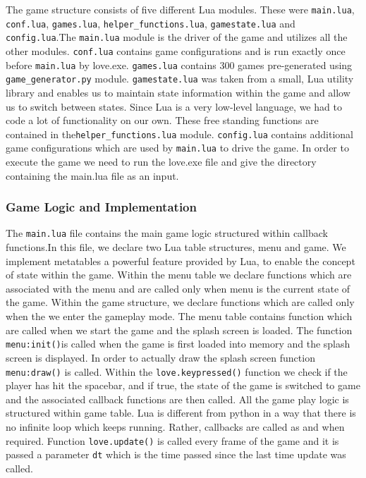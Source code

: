 	The game structure consists of five different Lua modules. These were \texttt{main.lua}, \texttt{conf.lua}, \texttt{games.lua},  \texttt{helper\_functions.lua}, \texttt{gamestate.lua} and \texttt{config.lua}.The \texttt{main.lua} module is the driver of the game and utilizes all the other modules. \texttt{conf.lua} contains game configurations and is run exactly once before \texttt{main.lua} by love.exe. \texttt{games.lua} contains 300 games pre-generated using \texttt{game\_generator.py} module. \texttt{gamestate.lua} was taken from  a small, Lua utility library and enables us to maintain state information within the game and allow us to switch between states. Since Lua is a very low-level language, we had to code a lot of functionality on our own. These free standing functions are contained in the\texttt{helper\_functions.lua} module. \texttt{config.lua} contains additional game configurations which are used by \texttt{main.lua} to drive the game. In order to execute the game we need to run the love.exe file and give the directory containing the main.lua file as an input.
	\subsubsection{Game Logic and Implementation}
	
	The \texttt{main.lua} file contains the main game logic structured within callback functions.In this file, we declare two Lua table structures, menu and game. We implement metatables a powerful feature provided by Lua, to enable the concept of state within the game. Within the menu table we declare functions which are associated with the menu and are called only when menu is the current state of the game. Within the game structure, we declare functions which are called only when the we enter the gameplay mode.
	The menu table contains function which are called when we start the game and the splash screen is loaded. The function \texttt{menu:init()}is called when the game is first loaded into memory and the splash screen is displayed. In order to actually draw the splash screen function \texttt{menu:draw()} is called. Within the \texttt{love.keypressed()} function we check if the player has hit the spacebar, and if true, the state of the game is switched to game and the associated callback functions are then called. All the game play logic is structured within game table. Lua is different from python in a way  that there is no infinite loop which keeps running. Rather, callbacks are called as and when required. Function \texttt{love.update()} is called every frame of the game and it is passed a parameter \texttt{dt} which is the time passed since the last time update was called.
	
